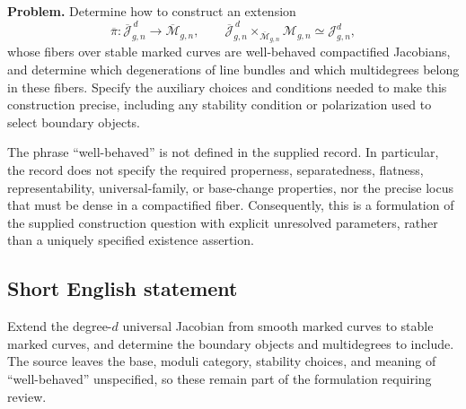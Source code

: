 \documentclass[11pt]{article}
\begin{document}
\textbf{Problem.} Determine how to construct an extension
\[
\overline\pi:\overline{\mathcal J}^{\,d}_{g,n}\longrightarrow\overline{\mathcal M}_{g,n},
\qquad
\overline{\mathcal J}^{\,d}_{g,n}\times_{\overline{\mathcal M}_{g,n}}\mathcal M_{g,n}
\simeq\mathcal J^d_{g,n},
\]
whose fibers over stable marked curves are well-behaved compactified Jacobians, and determine which degenerations of line bundles and which multidegrees belong in these fibers. Specify the auxiliary choices and conditions needed to make this construction precise, including any stability condition or polarization used to select boundary objects.

The phrase ``well-behaved'' is not defined in the supplied record. In particular, the record does not specify the required properness, separatedness, flatness, representability, universal-family, or base-change properties, nor the precise locus that must be dense in a compactified fiber. Consequently, this is a formulation of the supplied construction question with explicit unresolved parameters, rather than a uniquely specified existence assertion.
\subsection{Short English statement}
Extend the degree-\(d\) universal Jacobian from smooth marked curves to stable marked curves, and determine the boundary objects and multidegrees to include. The source leaves the base, moduli category, stability choices, and meaning of ``well-behaved'' unspecified, so these remain part of the formulation requiring review.
\end{document}
